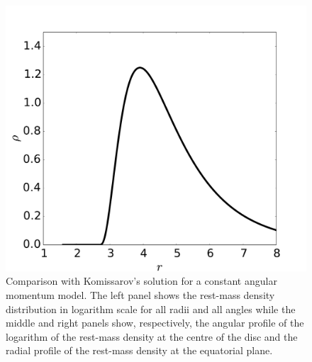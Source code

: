 \documentclass{aa}
\begin{document}
\begin{figure}[t]
\includegraphics[scale=0.14]{figures/fig1c.pdf}
\caption{Comparison with Komissarov's solution for a constant angular momentum model. The left panel shows the rest-mass density distribution in logarithm scale for all radii and all angles while the middle and right panels show, respectively, the angular profile of the logarithm of the rest-mass density at the centre of the disc and the radial profile of the rest-mass density at the equatorial plane.}
\label{komissarov}
\end{figure}
\end{document}
